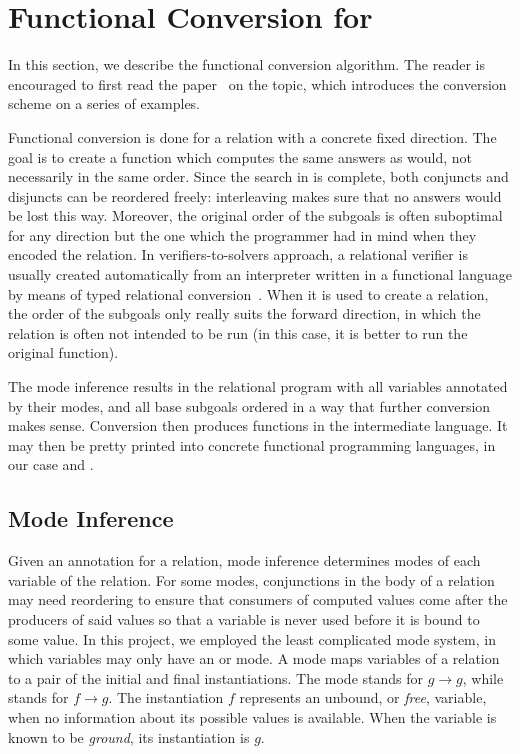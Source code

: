 \section{Functional Conversion for \mk}
\label{sec:conversion}

In this section, we describe the functional conversion algorithm.
The reader is encouraged to first read the paper~\cite{verbitskaia2022direction} on the topic, which introduces the conversion scheme on a series of examples.

Functional conversion is done for a relation with a concrete fixed direction.
The goal is to create a function which computes the same answers as \mk would, not necessarily in the same order.
Since the search in \mk is complete, both conjuncts and disjuncts can be reordered freely: interleaving makes sure that no answers would be lost this way.
Moreover, the original order of the subgoals is often suboptimal for any direction but the one which the programmer had in mind when they encoded the relation.
In verifiers-to-solvers approach, a relational verifier is usually created automatically from an interpreter written in a functional language by means of typed relational conversion~\cite{lozov2018typed}.
When it is used to create a relation, the order of the subgoals only really suits the forward direction, in which the relation is often not intended to be run (in this case, it is better to run the original function).

The mode inference results in the relational program with all variables annotated by their modes, and all base subgoals ordered in a way that further conversion makes sense.
Conversion then produces functions in the intermediate language.
It may then be pretty printed into concrete functional programming languages, in our case \haskell and \ocaml.


\subsection{Mode Inference}


Given an annotation for a relation, mode inference determines modes of each variable of the relation.
For some modes, conjunctions in the body of a relation may need reordering to ensure that consumers of computed values come after the producers of said values so that a variable is never used before it is bound to some value.
In this project, we employed the least complicated mode system, in which variables may only have an \inm or \outm mode.
A mode maps variables of a relation to a pair of the initial and final instantiations.
The mode \inm stands for $g \rightarrow g$, while \outm stands for $f \rightarrow g$.
The instantiation $f$ represents an unbound, or \emph{free}, variable, when no information about its possible values is available.
When the variable is known to be \emph{ground}, its instantiation is $g$.


